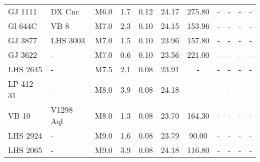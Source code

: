 \begin{landscape}
\begin{center}
\begin{longtable}{l l l c c c c c c c c}
GJ 1111	     &  DX Cnc & M6.0 &  1.7	& 0.12 &	24.17 &	275.80 & -	  &   -	  &   -	     &    -   \\
Gl 644C	     &  VB 8   & M7.0 &  2.3	& 0.10 &	24.15 &	153.96 & -	  &   -	  &   -	     &    -   \\
GJ 3877	     &LHS 3003 & M7.0 &  1.5	& 0.10 &	23.96 &	157.80 & -	  &   -	  &   -	     &    -   \\
GJ 3622	     &  -	   & M7.0 &  0.6	& 0.10 &	23.56 &	221.00 & -	  &   -	  &   -	     &    -   \\
LHS 2645	 &  -      & M7.5 &  2.1	& 0.08 &	23.91 &	-	   & -	  &   -	  &   -	     &    -   \\
LP 412-31    & 	-	   & M8.0 &  3.9	& 0.08 &	24.18 &	-	   & -	  &   -	  &   -	     &    -   \\
VB 10	     &V1298 Aql& M8.0 &  1.3	& 0.08 &	23.70 &	164.30 & -	  &   -	  &   -	     &    -   \\
LHS 2924	 &  -	   & M9.0 &  1.6	& 0.08 &	23.79 &	90.00  & -	  &   -	  &   -	     &    -   \\
LHS 2065	 &  -	   & M9.0 &  3.9	& 0.08 &	24.18 &	116.80 & -	  &   -	  &   -	     &    - 
    \end{longtable}
\end{center}
\end{landscape}

\doublespacing

